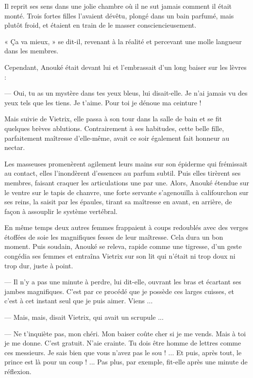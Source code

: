 \documentclass[a4paper, 11pt, oneside, polutonikogreek, french]{article}
\begin{document}
Il reprit ses sens dans une jolie chambre où il ne sut jamais comment il était monté. Trois fortes filles l'avaient dévêtu, plongé dans un bain parfumé, mais plutôt froid, et étaient en train de le masser consciencieusement.

« Ça va mieux, » se dit-il, revenant à la réalité et percevant une molle langueur dans les membres.

Cependant, Anouké était devant lui et l'embrassait d'un long baiser sur les lèvres :

--- Oui, tu as un mystère dans tes yeux bleus, lui disait-elle. Je n'ai jamais vu des yeux tels que les tiens. Je t'aime. Pour toi je dénoue ma ceinture !

Mais suivie de Vietrix, elle passa à son tour dans la salle de bain et se fit quelques brèves ablutions. Contrairement à ses habitudes, cette belle fille, parfaitement maîtresse d'elle-même, avait ce soir également fait honneur au nectar.

Les masseuses promenèrent agilement leurs mains sur son épiderme qui frémissait au contact, elles l'inondèrent d'essences au parfum subtil. Puis elles tirèrent ses membres, faisant craquer les articulations une par une. Alors, Anouké étendue sur le ventre sur le tapis de chanvre, une forte servante s'agenouilla à califourchon sur ses reins, la saisit par les épaules, tirant sa maîtresse en avant, en arrière, de façon à assouplir le système vertébral.

En même temps deux autres femmes frappaient à coups redoublés avec des verges étoffées de soie les magnifiques fesses de leur maîtresse. Cela dura un bon moment. Puis soudain, Anouké se releva, rapide comme une tigresse, d'un geste congédia ses femmes et entraîna Vietrix sur son lit qui n'était ni trop doux ni trop dur, juste à point.

--- Il n'y a pas une minute à perdre, lui dit-elle, ouvrant les bras et écartant ses jambes magnifiques. C'est par ce procédé que je possède ces larges cuisses, et c'est à cet instant seul que je puis aimer. Viens ...

--- Mais, mais, disait Vietrix, qui avait un scrupule ...

--- Ne t'inquiète pas, mon chéri. Mon baiser coûte cher si je me vends. Mais à toi je me donne. C'est gratuit. N'aie crainte. Tu dois être homme de lettres comme ces messieurs. Je sais bien que vous n'avez pas le sou ! ... Et puis, après tout, le prince est là pour un coup ! ... Pas plus, par exemple, fit-elle après une minute de réflexion.
\end{document}

